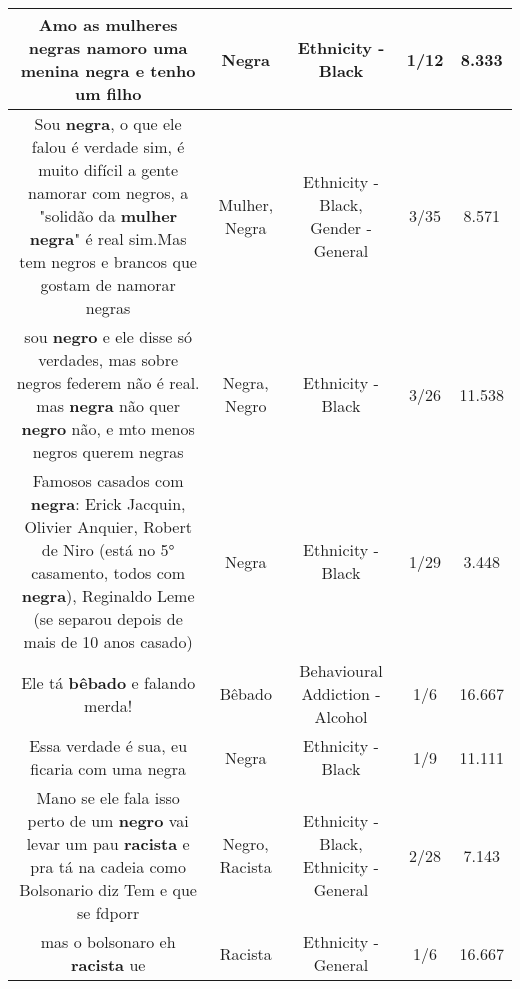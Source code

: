 \documentclass[11pt]{article}
\newlength\mylength
\begin{document}
\begin{center}
\begin{longtable}{|C{.65\mylength}|C{.30\mylength}|C{.12\mylength}|C{.12\mylength}|C{.12\mylength}|}
  \small Amo as mulheres negras namoro uma menina \textbf{negra} e tenho um filho\normalsize   & Negra & Ethnicity - Black & 1/12 & 8.333 \\  \hline
  \small Sou \textbf{negra}, o que ele falou é verdade sim, é muito difícil a gente namorar com negros, a "solidão da \textbf{mulher}  \textbf{negra}" é real sim.Mas tem negros e brancos que gostam de namorar negras\normalsize   & Mulher, Negra & Ethnicity - Black, Gender - General & 3/35 & 8.571 \\  \hline
  \small sou \textbf{negro} e ele disse só verdades, mas sobre negros federem não é real. mas \textbf{negra} não quer \textbf{negro} não, e mto menos negros querem negras\normalsize   & Negra, Negro & Ethnicity - Black & 3/26 & 11.538 \\  \hline
  \small Famosos casados com \textbf{negra}: Erick Jacquin, Olivier Anquier, Robert de Niro (está no 5° casamento, todos com \textbf{negra}), Reginaldo Leme (se separou depois de mais de 10 anos casado)\normalsize   & Negra & Ethnicity - Black & 1/29 & 3.448 \\  \hline
  \small Ele tá \textbf{bêbado} e falando merda!\normalsize   & Bêbado & Behavioural Addiction - Alcohol & 1/6 & 16.667 \\  \hline
  \small Essa verdade é sua, eu ficaria com uma negra\normalsize   & Negra & Ethnicity - Black & 1/9 & 11.111 \\  \hline
  \small Mano se ele fala isso perto de um \textbf{negro} vai levar um pau \textbf{racista} e pra tá na cadeia como Bolsonario diz Tem e que se fd\@ porr\@\normalsize   & Negro, Racista & Ethnicity - Black, Ethnicity - General & 2/28 & 7.143 \\  \hline
  \small mas o bolsonaro eh \textbf{racista} ue\normalsize   & Racista & Ethnicity - General & 1/6 & 16.667 \\  \hline

\end{longtable}
\end{center}
\end{document}
